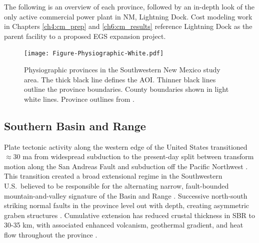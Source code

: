 The following is an overview of each province, followed by an in-depth look of the only active commercial power plant in NM, Lightning Dock. Cost modeling work in Chapters \ref{ch4:cm_prep} and \ref{ch6:cm_results} reference Lightning Dock as the parent facility to a proposed EGS expansion project.

\begin{figure}
\centering
\texttt{[image: Figure-Physiographic-White.pdf]}
\caption[Physiographic provinces of SW New Mexico]{Physiographic provinces in the Southwestern New Mexico study area. The thick black line defines the AOI. Thinner black lines outline the province boundaries. County boundaries shown in light white lines. Province outlines from \protect\citep[~Figure 2-2]{bielicki_hydrogeolgic_2015}.}
\label{fig:phys-provinces}
\end{figure}

\subsection{Southern Basin and Range}\label{ch2:sbr_province}
Plate tectonic activity along the western edge of the United States transitioned $\approx$30 \acrshort{ma} from widespread subduction to the present-day split between transform motion along the San Andreas Fault and subduction off the Pacific Northwest \citep[p.\ 81]{fowler_solid_2005}. This transition created a broad extensional regime in the Southwestern U.S.\ believed to be responsible for the alternating narrow, fault-bounded mountain-and-valley signature of the Basin and Range \citep{henry_real_1992}. Successive north-south striking normal faults in the province level out with depth, creating asymmetric graben structures \citep[p.\ 28-29]{frisch_continental_2011}. Cumulative extension has reduced crustal thickness in SBR to 30-35 km, with associated enhanced volcanism, geothermal gradient, and heat flow throughout the province \citep{lerch_crustal_2007}.

